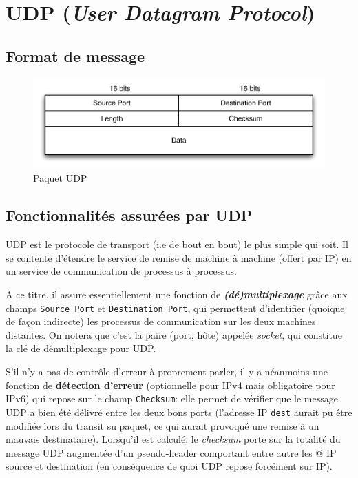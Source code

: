 \documentclass[11pt,english,french]{scrreprt}
\theoremstyle{remark}
\theoremstyle{definition}
\begin{document}
\section{UDP (\emph{User Datagram Protocol})} %

\subsection{Format de message} %

\begin{figure}[h!]
	\center
	\includegraphics[scale=.75]{graphes/TCP/paquet_UDP}
	\caption{Paquet UDP}
\end{figure}

\subsection{Fonctionnalités assurées par UDP} %

UDP est le protocole de transport (i.e de bout en bout) le plus simple qui soit. Il se contente d'étendre le service de remise de machine à machine (offert par IP) en un service de communication de processus à processus.

A ce titre, il assure essentiellement une fonction de \emph{\textbf{(dé)multiplexage}} grâce aux champs \lstinline!Source Port! et \lstinline!Destination Port!, qui permettent d'identifier (quoique de façon indirecte) les processus de communication sur les deux machines distantes. On notera que c'est la paire (port, hôte) appelée \emph{socket}, qui constitue la clé de démultiplexage pour UDP.

S'il n'y a pas de contrôle d'erreur à proprement parler, il y a néanmoins une fonction de \textbf{détection d'erreur} (optionnelle pour IPv4 mais obligatoire pour IPv6) qui repose sur le champ \lstinline!Checksum!: elle permet de vérifier que le message UDP a bien été délivré entre les deux bons ports (l'adresse IP \lstinline!dest! aurait pu être modifiée lors du transit su paquet, ce qui aurait provoqué une remise à un mauvais destinataire). Lorsqu'il est calculé, le \emph{checksum} porte sur la totalité du message UDP augmentée d'un pseudo-header comportant entre autre les @ IP source et destination (en conséquence de quoi UDP repose forcément sur IP).
\end{document}

